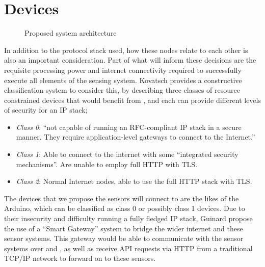\section{Devices}
\label{subsec:litreview:architecture:devices}
\begin{figure}
\centering
{}
\caption{Proposed system architecture}
\label{fig:litreview:devices}
\end{figure}

In addition to the protocol stack used, how these nodes relate to each other is also an important consideration. Part of what will inform these decisions are the requisite processing power and internet connectivity required to successfully execute all elements of the sensing system. Kovatsch \cite{kovatsch2013coap} provides a constructive classification system to consider this, by describing three classes of resource constrained devices that would benefit from \coap, and each can provide different levels of security for an IP stack;

\begin{itemize}
 \item \emph{Class 0}: ``not capable of running an RFC-compliant IP stack in a secure manner. They require application-level gateways to connect to the Internet.''
 \item \emph{Class 1}: Able to connect to the internet with some ``integrated security mechanisms''. Are unable to employ full HTTP with TLS.
 \item \emph{Class 2}: Normal Internet nodes, able to use the full HTTP stack with TLS.
\end{itemize}

The devices that we propose the sensors will connect to are the likes of the Arduino, which can be classified as class 0 or possibly class 1 devices. Due to their insecurity and difficulty running a fully fledged IP stack, Guinard \etal \cite{guinard2011internet} propose the use of a ``Smart Gateway'' system to bridge the wider internet and these sensor systems. This gateway would be able to communicate with the sensor systems over \coap and \lwifi, as well as receive API requests via HTTP from a traditional TCP/IP network to forward on to these sensors.

